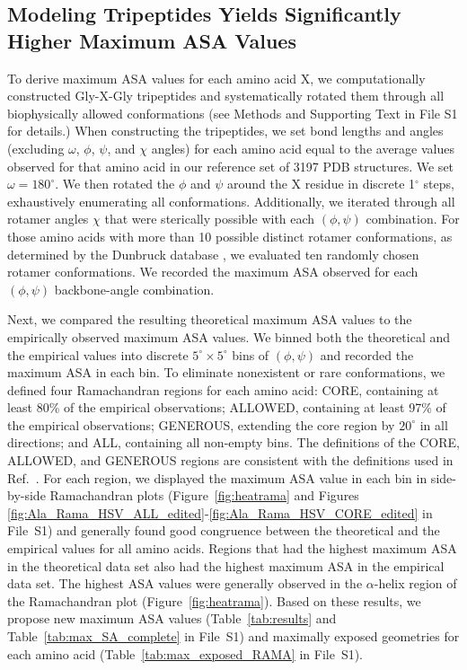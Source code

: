 \documentclass[11pt]{article}
\begin{document}
\subsection*{Modeling Tripeptides Yields Significantly Higher Maximum ASA Values}
To derive maximum ASA values for each amino acid X, we computationally constructed Gly-X-Gly tripeptides and systematically rotated them through all biophysically allowed  conformations (see Methods and Supporting Text in File S1 for details.) When constructing the tripeptides, we set bond lengths and angles (excluding $\omega$, $\phi$, $\psi$, and $\chi$ angles) for each amino acid equal to the average values observed for that amino acid in our reference set of 3197 PDB structures. We set $\omega=180^\circ$. We then rotated the $\phi$ and $\psi$ around the X residue in  discrete 1$^\circ$ steps, exhaustively enumerating all conformations. Additionally, we iterated through all rotamer angles $\chi$ that were sterically possible with each $(\phi, \psi)$ combination. For those amino acids with more than 10 possible distinct rotamer conformations, as determined by the Dunbruck database \cite{WangDunbrack2003}, we evaluated ten randomly chosen rotamer conformations. We recorded the maximum ASA observed for each $(\phi, \psi)$ backbone-angle combination.

Next, we compared the resulting theoretical maximum ASA values to the empirically observed maximum ASA values. We binned both the theoretical and the empirical values into discrete $5^\circ\times5^\circ$ bins of $(\phi, \psi)$ and recorded the maximum ASA in each bin. To eliminate nonexistent or rare conformations, we defined four Ramachandran regions for each amino acid: CORE, containing at least 80\% of the empirical observations; ALLOWED, containing at least 97\% of the empirical observations; GENEROUS, extending the core region by $20^\circ$ in all directions; and ALL, containing all non-empty bins. The definitions of the CORE, ALLOWED, and GENEROUS regions are consistent with the definitions used in Ref.~\cite{Morrisetal1992}. For each region, we displayed the maximum ASA value in each bin in side-by-side Ramachandran plots (Figure~\ref{fig:heatrama} and Figures \ref{fig:Ala_Rama_HSV_ALL_edited}-\ref{fig:Ala_Rama_HSV_CORE_edited} in File~S1) and generally found good congruence between the theoretical and the empirical values for all amino acids. Regions that had the highest maximum ASA in the theoretical data set also had the highest maximum ASA in the empirical data set. The highest ASA values were generally observed in the $\alpha$-helix region of the Ramachandran plot (Figure~\ref{fig:heatrama}). Based on these results, we propose new maximum ASA values (Table~\ref{tab:results} and Table~\ref{tab:max_SA_complete} in File~S1) and maximally exposed geometries for each amino acid (Table~\ref{tab:max_exposed_RAMA} in File~S1).
\end{document}
